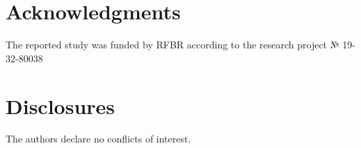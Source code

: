 \documentclass[9pt,twocolumn,twoside]{osajnl}
\begin{document}
\section*{Acknowledgments}
The reported study was funded by RFBR according to the research project № 19-32-80038
\section*{Disclosures}
The authors declare no conflicts of interest.
%
%
%
%
%
%
%
%
\end{document}
